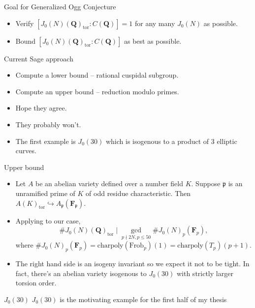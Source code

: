 \documentclass{beamer}
\newcommand{\QQ}{\mathbf{Q}}
\newcommand{\FF}{\mathbf{F}}
\newcommand{\tor}{\mathrm{tor}}
\newcommand{\Frob}{\mathrm{Frob}}
\newcommand{\p}{\mathfrak{p}}
\begin{document}
\begin{frame}{Goal for Generalized Ogg Conjecture}
    \begin{itemize}
        \item 
            Verify $[J_0(N)(\QQ)_\tor:C(\QQ)]=1$ for any many $J_0(N)$ as
            possible.
        \item
            Bound $[J_0(N)(\QQ)_\tor:C(\QQ)]$ as best as possible.
    \end{itemize}
\end{frame}

\begin{frame}{Current Sage approach}
    \begin{itemize}
        \item
            Compute a lower bound -- rational cuspidal subgroup.
        \item
            Compute an upper bound -- reduction modulo primes.
        \item
            Hope they agree. 
        \item
            They probably won't.
        \item
            The first example is $J_0(30)$ which is
            isogenous to a product of 3 elliptic curves.
    \end{itemize}
\end{frame}

\begin{frame}{Upper bound}
    \begin{itemize}
        \item 
            Let $A$ be an abelian variety defined over a number field $K$.
            Suppose $\p$ is an unramified prime of $K$ of odd residue
            characteristic. Then $A(K)_\tor \hookrightarrow A_\p(\FF_\p)$.
        \item
            Applying to our case,
            \[
                \#J_0(N)(\QQ)_\tor \mid  \gcd_{p\nmid 2N, p\leq 50} \#J_0(N)_p
                (\FF_p),
            \]
            where $\# J_0(N)_p(\FF_p)=\mathrm{charpoly}(\Frob_p)(1)
            =\mathrm{charpoly}(T_p)(p+1)$.
        \item
            The right hand side is an isogeny invariant so we expect it not to
            be tight. In fact, there's an abelian variety isogenous to
            $J_0(30)$ with strictly larger torsion order.
    \end{itemize}
\end{frame}

\begin{frame}{$J_0(30)$}
    \Large{$J_0(30)$ is the motivating example for the first half of my thesis}
\end{frame}
\end{document}
